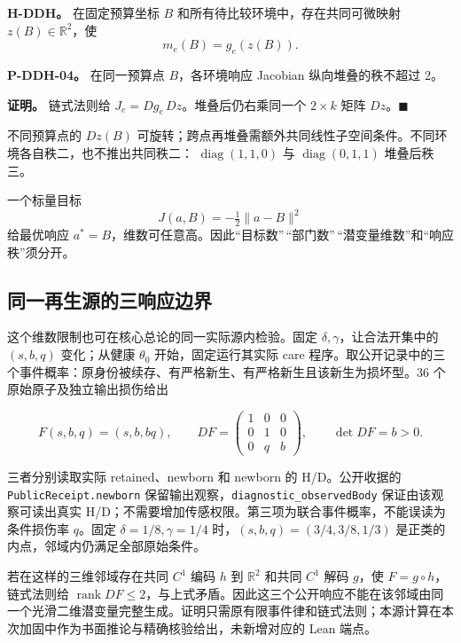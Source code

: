 \documentclass[
  11pt,
  oneside]{book}
\begin{document}
\textbf{H-DDH。} 在固定预算坐标 \(B\) 和所有待比较环境中，存在共同可微映射 \(z(B)\in\mathbb R^2\)，使 \[m_e(B)=g_e(z(B)).\]

\hypertarget{p-ddh-04}{}\label{p-ddh-04}

\textbf{P-DDH-04。} 在同一预算点 \(B\)，各环境响应 Jacobian 纵向堆叠的秩不超过 2。

\textbf{证明。} 链式法则给 \(J_e=Dg_e\,Dz\)。堆叠后仍右乘同一个 \(2\times k\) 矩阵 \(Dz\)。\(\blacksquare\)

不同预算点的 \(Dz(B)\) 可旋转；跨点再堆叠需额外共同线性子空间条件。不同环境各自秩二，也不推出共同秩二： \(\operatorname{diag}(1,1,0)\) 与 \(\operatorname{diag}(0,1,1)\) 堆叠后秩三。

一个标量目标 \[J(a,B)=-\tfrac12\|a-B\|^2\] 给最优响应 \(a^*=B\)，维数可任意高。因此``目标数''\,``部门数''\,``潜变量维数''和``响应秩''须分开。

\subsection{同一再生源的三响应边界}\label{ux540cux4e00ux518dux751fux6e90ux7684ux4e09ux54cdux5e94ux8fb9ux754c}

这个维数限制也可在核心总论的同一实际源内检验。固定 \(\delta,\gamma\)，让合法开集中的 \((s,b,q)\) 变化；从健康 \(\theta_0\) 开始，固定运行其实际 care 程序。取公开记录中的三个事件概率：原身份被续存、有严格新生、有严格新生且该新生为损坏型。36 个原始原子及独立输出损伤给出

\[F(s,b,q)=(s,b,bq),\qquad
DF=\begin{pmatrix}1&0&0\\0&1&0\\0&q&b\end{pmatrix},\qquad
\det DF=b>0.\]

三者分别读取实际 retained、newborn 和 newborn 的 H/D。公开收据的 \nolinkurl{PublicReceipt.newborn} 保留输出观察，\nolinkurl{diagnostic_observedBody} 保证由该观察可读出真实 H/D；不需要增加传感权限。第三项为联合事件概率，不能误读为条件损伤率 \(q\)。固定 \(\delta=1/8,\gamma=1/4\) 时，\((s,b,q)=(3/4,3/8,1/3)\) 是正类的内点，邻域内仍满足全部原始条件。

若在这样的三维邻域存在共同 \(C^1\) 编码 \(h\) 到 \(\mathbb R^2\) 和共同 \(C^1\) 解码 \(g\)，使 \(F=g\circ h\)，链式法则给 \(\operatorname{rank}DF\le2\)，与上式矛盾。因此这三个公开响应不能在该邻域由同一个光滑二维潜变量完整生成。证明只需原有限事件律和链式法则；本源计算在本次加固中作为书面推论与精确核验给出，未新增对应的 Lean 端点。
\end{document}
